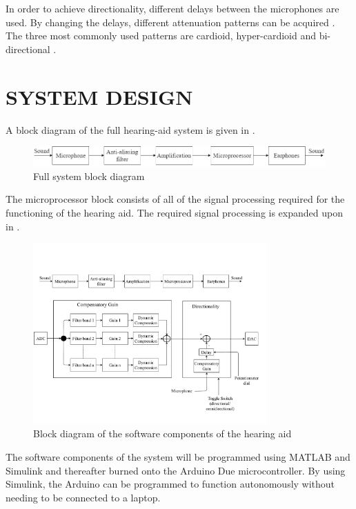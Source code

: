 \documentclass[10pt,twocolumn]{witseiepaper}
\begin{document}
In order to achieve directionality, different delays between the microphones are used. By changing the delays, different attenuation patterns can be acquired \cite{trends_in_amplification, Distortion_of_interaural_time_cues}. The three most commonly used patterns are cardioid, hyper-cardioid and bi-directional \cite{trends_in_amplification}.

\section{SYSTEM DESIGN}

A block diagram of the full hearing-aid system is given in .

\begin{figure}[t]
	\centering
	\includegraphics[width=1\textwidth]{highLeveLSystemDiagram.png}
	\caption{Full system block diagram}
	\raggedright
	\label{fig:block}	
\end{figure}

The microprocessor block consists of all of the signal processing required for the functioning of the hearing aid. The required signal processing is expanded upon in .

\begin{figure}[t]
	\centering
	\includegraphics[width=0.8\textwidth]{microBlockDiagrm.pdf}
	\caption{Block diagram of the software components of the hearing aid}
	\raggedright
	\label{fig:microBlock}	
\end{figure}

The software components of the system will be programmed using MATLAB and Simulink and thereafter burned onto the Arduino Due microcontroller. By using Simulink, the Arduino can be programmed to function autonomously without needing to be connected to a laptop.
\end{document}
